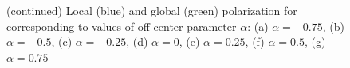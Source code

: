 \documentclass[../../master_thesis_np.tex]{subfiles}
\begin{document}
		\begin{figure}[t]
			\ContinuedFloat
			\centering
			
			
			\caption{(continued) Local (blue) and global (green) polarization for corresponding to values of off center parameter $\alpha$: (a) $\alpha = -0.75$, (b) $\alpha = -0.5$, (c) $\alpha = -0.25$, (d) $\alpha = 0$, (e) $\alpha = 0.25$, (f) $\alpha = 0.5$, (g) $\alpha = 0.75$}
			\label{fig:lj_oc_pol}
		\end{figure}
		
\end{document}
